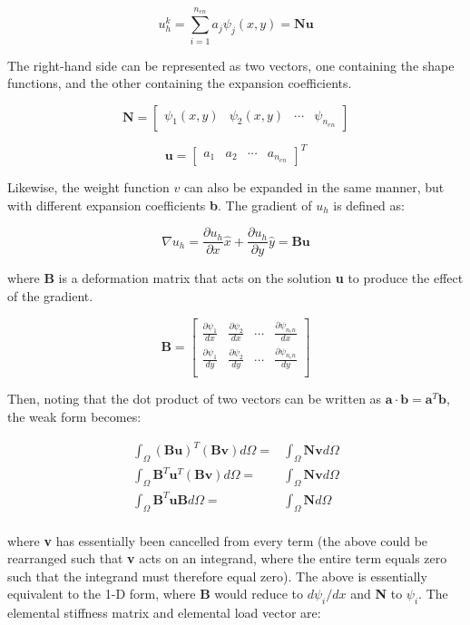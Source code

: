 \documentclass[10pt]{article}
\newcommand{\beq}{\begin{equation}}
\newcommand{\eeq}{\end{equation}}
\newcommand{\beqa}{\begin{equation}\begin{aligned}}
\newcommand{\eeqa}{\end{aligned}\end{equation}}
\begin{document}
\beq
u_h^k=\sum_{i=1}^{n_{en}}a_j\psi_j(x,y)=\textbf{N}\textbf{u}
\eeq

The right-hand side can be represented as two vectors, one containing the shape functions, and the other containing the expansion coefficients. 

\beq
\textbf{N}=\begin{bmatrix} \psi_1(x,y) & \psi_2(x,y) & \cdots & \psi_{n_{en}}\end{bmatrix}
\eeq

\beq
\textbf{u}=\begin{bmatrix} a_1 & a_2 & \cdots & a_{n_{en}}\end{bmatrix}^T
\eeq

Likewise, the weight function \(v\) can also be expanded in the same manner, but with different expansion coefficients \textbf{b}. The gradient of \(u_h\) is defined as:

\beq
\nabla u_h=\frac{\partial u_h}{\partial x}\hat{x}+\frac{\partial u_h}{\partial y}\hat{y}=\textbf{B}\textbf{u}
\eeq

where \textbf{B} is a deformation matrix that acts on the solution \textbf{u} to produce the effect of the gradient. 

\beq
\textbf{B}=\begin{bmatrix}
\frac{\partial\psi_1}{dx} & \frac{\partial\psi_2}{dx} & \cdots & \frac{\partial\psi_{n_en}}{dx}\\
\frac{\partial\psi_1}{dy} & \frac{\partial\psi_2}{dy} & \cdots & \frac{\partial\psi_{n_en}}{dy}\\
\end{bmatrix}
\eeq

Then, noting that the dot product of two vectors can be written as \(\textbf{a}\cdot\textbf{b}=\textbf{a}^T\textbf{b}\), the weak form becomes:

\beqa
\int_\Omega (\textbf{B}\textbf{u})^T(\textbf{B}\textbf{v})d\Omega=&\int_\Omega \textbf{N}\textbf{v}d\Omega\\
\int_\Omega \textbf{B}^T\textbf{u}^T(\textbf{B}\textbf{v})d\Omega=&\int_\Omega \textbf{N}\textbf{v}d\Omega\\
\int_\Omega \textbf{B}^T\textbf{u}\textbf{B}d\Omega=&\int_\Omega \textbf{N}d\Omega\\
\eeqa

where \textbf{v} has essentially been cancelled from every term (the above could be rearranged such that \textbf{v} acts on an integrand, where the entire term equals zero such that the integrand must therefore equal zero). The above is essentially equivalent to the 1-D form, where \textbf{B} would reduce to \(d\psi_i/dx\) and \textbf{N} to \(\psi_i\). The elemental stiffness matrix and elemental load vector are:
\end{document}
